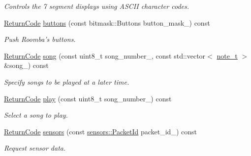 \begin{DoxyCompactItemize}
\begin{DoxyCompactList}\small\item\em Controls the 7 segment displays using A\+S\+C\+I\+I character codes. \end{DoxyCompactList}\item 
\hyperlink{classroomba_1_1series500_1_1oi_1_1_o_i_encoder_ac2c8ad2f0306050926f89882d74696cc}{Return\+Code} \hyperlink{classroomba_1_1series500_1_1oi_1_1_o_i_encoder_ad1b02e78c92ebde01bfda683618c8a05}{buttons} (const bitmask\+::\+Buttons button\+\_\+mask\+\_\+) const 
\begin{DoxyCompactList}\small\item\em Push Roomba’s buttons. \end{DoxyCompactList}\item 
\hyperlink{classroomba_1_1series500_1_1oi_1_1_o_i_encoder_ac2c8ad2f0306050926f89882d74696cc}{Return\+Code} \hyperlink{classroomba_1_1series500_1_1oi_1_1_o_i_encoder_a420d412677b5359d413f0baf729a13e3}{song} (const uint8\+\_\+t song\+\_\+number\+\_\+, const std\+::vector$<$ \hyperlink{classroomba_1_1series500_1_1oi_1_1_o_i_encoder_ab4b7bf89bb873d838512791e339694fd}{note\+\_\+t} $>$ \&song\+\_\+) const 
\begin{DoxyCompactList}\small\item\em Specify songs to be played at a later time. \end{DoxyCompactList}\item 
\hyperlink{classroomba_1_1series500_1_1oi_1_1_o_i_encoder_ac2c8ad2f0306050926f89882d74696cc}{Return\+Code} \hyperlink{classroomba_1_1series500_1_1oi_1_1_o_i_encoder_af555b482307a4918c2b98eea4d8f2ba2}{play} (const uint8\+\_\+t song\+\_\+number\+\_\+) const 
\begin{DoxyCompactList}\small\item\em Select a song to play. \end{DoxyCompactList}\item 
\hyperlink{classroomba_1_1series500_1_1oi_1_1_o_i_encoder_ac2c8ad2f0306050926f89882d74696cc}{Return\+Code} \hyperlink{classroomba_1_1series500_1_1oi_1_1_o_i_encoder_a5b7751abfbb6a07a0c62b7a1646e3703}{sensors} (const \hyperlink{namespaceroomba_1_1series500_1_1oi_1_1sensors_a909f47d40452d1cabb85eef642ac04b6}{sensors\+::\+Packet\+Id} packet\+\_\+id\+\_\+) const 
\begin{DoxyCompactList}\small\item\em Request sensor data. \end{DoxyCompactList}\item 

\end{DoxyCompactItemize}
